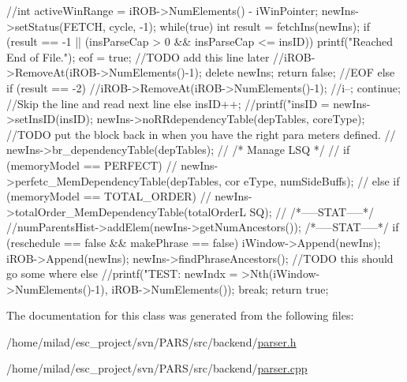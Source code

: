 \begin{DoxyCode}
                                         {
        //int activeWinRange = iROB->NumElements() - iWinPointer;
        newIns->setStatus(FETCH, cycle, -1);
        while(true) {
                int result = fetchIns(newIns);
                if (result == -1 || (insParseCap > 0 && insParseCap <= insID)) {
                        printf("Reached End of File.\n");
                        eof = true; //TODO add this line later
                        //iROB->RemoveAt(iROB->NumElements()-1);
                        delete newIns;
                        return false;
                } //EOF
                else if (result == -2) {
                        //iROB->RemoveAt(iROB->NumElements()-1);
                        //i--;
                        continue; //Skip the line and read next line
                } else {
                        insID++;
                        //printf("insID = %
                        newIns->setInsID(insID);
                        newIns->noRRdependencyTable(depTables, coreType);
                        //TODO put the block back in when you have the right para
      meters defined.
                        // newIns->br_dependencyTable(depTables);
                        // /* Manage LSQ */ 
                        // if (memoryModel == PERFECT) {
                        //      newIns->perfetc_MemDependencyTable(depTables, cor
      eType, numSideBuffs);
                        // } else if (memoryModel == TOTAL_ORDER) {
                        //      newIns->totalOrder_MemDependencyTable(totalOrderL
      SQ);
                        // }
                        /*-----STAT-----*/
                        //numParentsHist->addElem(newIns->getNumAncestors());
                        /*-----STAT-----*/
                        if (reschedule == false && makePhrase == false)
                                iWindow->Append(newIns);
                        iROB->Append(newIns);
                        newIns->findPhraseAncestors(); //TODO this should go some
      where else
                        //printf("TEST: newIndx = %
      >Nth(iWindow->NumElements()-1), iROB->NumElements());
                        break;
                }
        }
        return true;
}
\end{DoxyCode}


The documentation for this class was generated from the following files:\begin{DoxyCompactItemize}
\item 
/home/milad/esc\_\-project/svn/PARS/src/backend/\hyperlink{parser_8h}{parser.h}\item 
/home/milad/esc\_\-project/svn/PARS/src/backend/\hyperlink{backend_2parser_8cpp}{parser.cpp}\end{DoxyCompactItemize}
